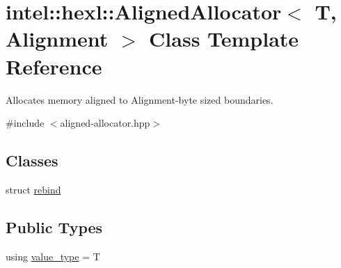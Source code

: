 \hypertarget{classintel_1_1hexl_1_1AlignedAllocator}{}\section{intel\+:\+:hexl\+:\+:Aligned\+Allocator$<$ T, Alignment $>$ Class Template Reference}
\label{classintel_1_1hexl_1_1AlignedAllocator}


Allocates memory aligned to Alignment-\/byte sized boundaries.  




{\ttfamily \#include $<$aligned-\/allocator.\+hpp$>$}

\subsection*{Classes}
\begin{DoxyCompactItemize}
\item 
struct \hyperlink{structintel_1_1hexl_1_1AlignedAllocator_1_1rebind}{rebind}
\end{DoxyCompactItemize}
\subsection*{Public Types}
\begin{DoxyCompactItemize}
\item 
using \hyperlink{classintel_1_1hexl_1_1AlignedAllocator_a8a3b7b0531d253a37a59fe1ffe12ec8a}{value\+\_\+type} = T
\end{DoxyCompactItemize}
